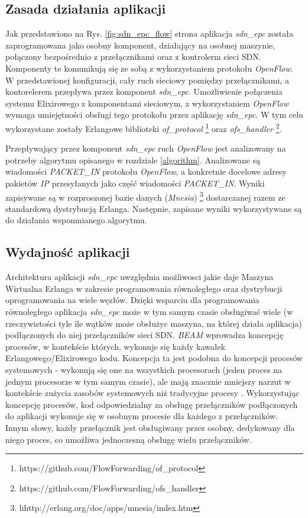 \subsection{Zasada działania aplikacji}

Jak przedstawiono na Rys. \ref{fig:sdn_epc_flow} strona
\pageref{fig:sdn_epc_flow} aplikacja \textit{sdn\_epc} została zaprogramowana
jako osobny komponent, działający na osobnej maszynie, połączony bezpośrednio z
przełącznikami oraz z kontrolerm sieci SDN. Komponenty te komunikują się ze
sobą z wykorzystaniem protokołu \textit{OpenFlow}. W przedstawionej konfiguracji,
cały ruch sieciowy pomiędzy przełącznikami, a kontorelerem przepływa przez
komponent \textit{sdn\_epc}. Umożliwienie połączenia systemu Elixirowego z
komponentami sieciowym, z wykorzystaniem \textit{OpenFlow} wymaga umiejętności
obsługi tego protokołu przez aplikację \textit{sdn\_epc}. W tym celu
wykorzystane zostały Erlangowe biblioteki \textit{of\_protocol}
\footnote{https://github.com/FlowForwarding/of\_protocol} oraz
\textit{ofs\_handler} \footnote{https://github.com/FlowForwarding/ofs\_handler}.

Przepływający przez komponent \textit{sdn\_epc} ruch \textit{OpenFlow} jest
analizowany na potrzeby algorytmu opisanego w rozdziale \ref{algorithm}.
Analizowane są wiadomości \textit{PACKET\_IN} protokołu \textit{OpenFlow}, a
konkretnie docelowe adresy pakietów \textit{IP} przesyłanych jako część
wiadomości \textit{PACKET\_IN}. Wyniki zapisywane są w rozproszonej bazie danych
(\textit{Mnesia}) \footnote{hhttp://erlang.org/doc/apps/mnesia/index.htm}
dostarczanej razem ze standardową dystrybucją Erlanga. Następnie, zapisane
wyniki wykorzystywane są do działania wspomnianego algorytmu.

\subsection{Wydajność aplikacji}

Architektura aplikacji \textit{sdn\_epc} uwzględnia możliwosci jakie daje
Maszyna Wirtualna Erlanga w zakresie programowania równoległego oraz dystrybucji
oprogramowania na wiele węzłów. Dzięki wsparciu dla programowania równoległego
aplikacja \textit{sdn\_epc} może w tym samym czasie obsługiwać wiele (w
rzeczywistości tyle ile wątków może obsłużyc maszyna, na której działa
aplikacja) podłączonych do niej przełączników sieci SDN. \textit{BEAM} wprowadza
koncepcję procesów, w kontekście których, wykonuje się każdy kawałek
Erlangowego/Elixirowego kodu. Koncepcja ta jest podobna do koncepcji procesów
systemowych - wykonują się one na wszystkich procesorach (jeden proces na
jednym procesorze w tym samym czasie), ale mają znacznie mniejszy narzut w
kontekście zużycia zasobów systemowych niż tradycyjne procesy \cite{progelixir}.
Wykorzystując koncepcję procesów, kod odpowiedzialny za obsługę przełączników
podłączonych do aplikacji wykonuje się w osobnym procesie dla każdego z
przełączników. Innym słowy, każdy przełącznik jest obsługiwany przez osobny,
dedykowany dla niego proces, co umożliwa jednoczesną obsługę wielu
przełączników.

